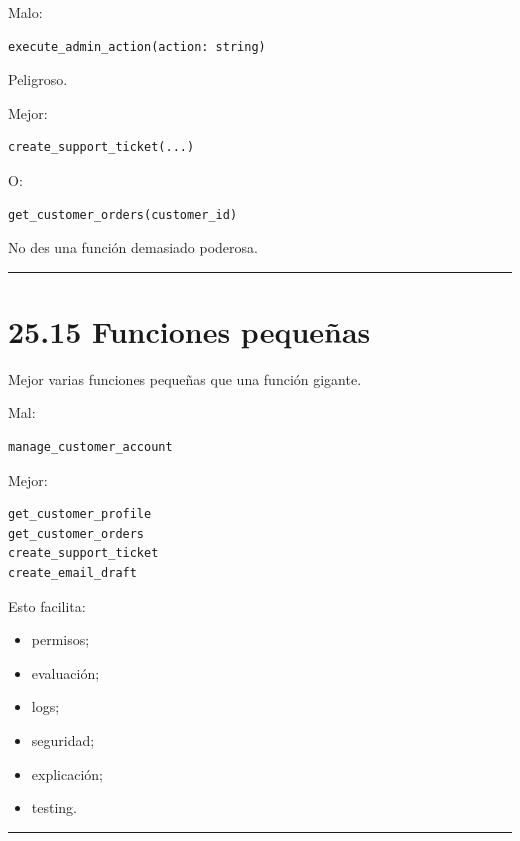 Malo:

\begin{lstlisting}
execute_admin_action(action: string)
\end{lstlisting}

Peligroso.

Mejor:

\begin{lstlisting}
create_support_ticket(...)
\end{lstlisting}

O:

\begin{lstlisting}
get_customer_orders(customer_id)
\end{lstlisting}

No des una función demasiado poderosa.

\begin{center}\rule{0.5\linewidth}{0.5pt}\end{center}

\section{25.15 Funciones pequeñas}\label{funciones-pequeuxf1as}

Mejor varias funciones pequeñas que una función gigante.

Mal:

\begin{lstlisting}
manage_customer_account
\end{lstlisting}

Mejor:

\begin{lstlisting}
get_customer_profile
get_customer_orders
create_support_ticket
create_email_draft
\end{lstlisting}

Esto facilita:

\begin{itemize}
\tightlist
\item
  permisos;
\item
  evaluación;
\item
  logs;
\item
  seguridad;
\item
  explicación;
\item
  testing.
\end{itemize}

\begin{center}\rule{0.5\linewidth}{0.5pt}\end{center}

